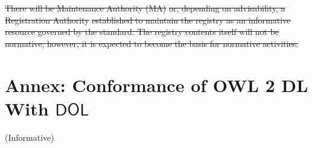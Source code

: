 \documentclass[10pt,fleqn,final]{scrreprt}
\newcommand*{\termref}[1]{\index{#1}#1\xspace}
\newcommand*{\IS}{OMG Specification\xspace}
\newcommand*{\DOL}{\ensuremath{\mathsf{DOL}}\xspace}
\newcommand{\informative}[0]{{\begin{center}{\Large{(Informative})}\end{center}} \bigskip}
\newcommand{\infannex}[1]{ \chapter{Annex: #1}  \informative }
\providecommand{\DIFdel}[1]{{\protect\color{red}\sout{#1}}}                      %
\providecommand{\DIFdelbegin}{} %
\providecommand{\DIFdelend}{} %
\begin{document}



\DIFdelbegin \DIFdel{There will be Maintenance Authority (MA) }%
\DIFdel{or, depending on advisability, a Registration
Authority}%
\DIFdel{established to maintain the registry as an informative resource governed by the
standard.  The registry contents itself will not be normative; however, it is 
expected to become the basis for normative activities.
}\DIFdelend %


\infannex{Conformance of OWL 2 DL With \DOL}\label{a:owl}
\end{document}
